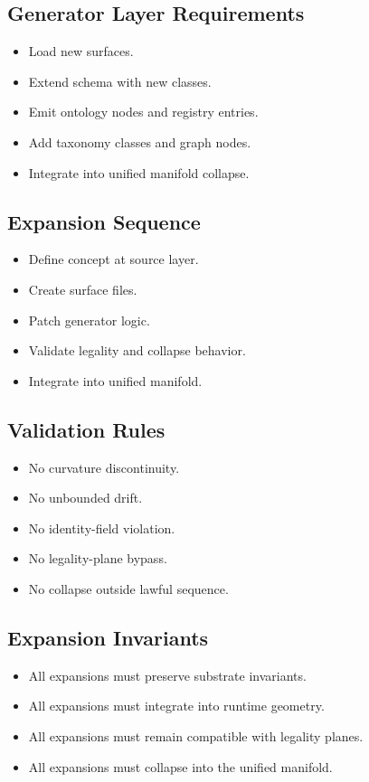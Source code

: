 \subsection{Generator Layer Requirements}
\begin{itemize}
    \item Load new surfaces.
    \item Extend schema with new classes.
    \item Emit ontology nodes and registry entries.
    \item Add taxonomy classes and graph nodes.
    \item Integrate into unified manifold collapse.
\end{itemize}

\subsection{Expansion Sequence}
\begin{itemize}
    \item Define concept at source layer.
    \item Create surface files.
    \item Patch generator logic.
    \item Validate legality and collapse behavior.
    \item Integrate into unified manifold.
\end{itemize}

\subsection{Validation Rules}
\begin{itemize}
    \item No curvature discontinuity.
    \item No unbounded drift.
    \item No identity-field violation.
    \item No legality-plane bypass.
    \item No collapse outside lawful sequence.
\end{itemize}

\subsection{Expansion Invariants}
\begin{itemize}
    \item All expansions must preserve substrate invariants.
    \item All expansions must integrate into runtime geometry.
    \item All expansions must remain compatible with legality planes.
    \item All expansions must collapse into the unified manifold.
\end{itemize}
